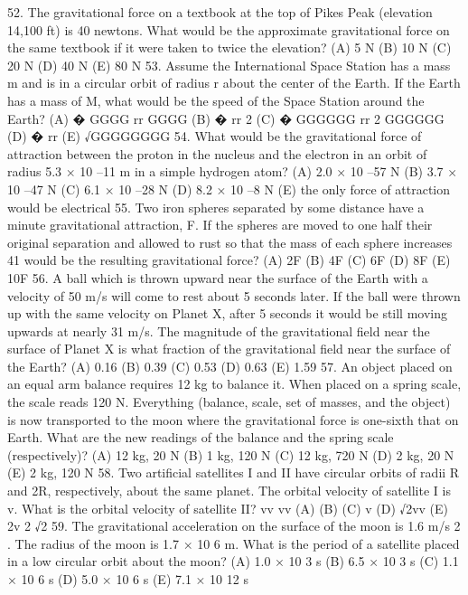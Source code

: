 52. The gravitational force on a textbook at the top of Pikes Peak (elevation 14,100 ft) is 40 newtons. What would
be the approximate gravitational force on the same textbook if it were taken to twice the elevation?
(A) 5 N (B) 10 N (C) 20 N (D) 40 N (E) 80 N
53. Assume the International Space Station has a mass m and is in a circular orbit of radius r about the center of the
Earth. If the Earth has a mass of M, what would be the speed of the Space Station around the Earth?
(A) �
GGGG
rr
GGGG
(B) �
rr 2
(C) �
GGGGGG
rr 2
GGGGGG
(D) �
rr
(E) √GGGGGGGG
54. What would be the gravitational force of attraction between the proton in the nucleus and the electron in an
orbit of radius 5.3 × 10 –11 m in a simple hydrogen atom?
(A) 2.0 × 10 –57 N (B) 3.7 × 10 –47 N (C) 6.1 × 10 –28 N (D) 8.2 × 10 –8 N
(E) the only force of attraction would be electrical
55. Two iron spheres separated by some distance have a minute gravitational attraction, F. If the spheres are moved
to one half their original separation and allowed to rust so that the mass of each sphere increases 41%
would be the resulting gravitational force?
(A) 2F (B) 4F (C) 6F (D) 8F (E) 10F
56. A ball which is thrown upward near the surface of the Earth with a velocity of 50 m/s will come to rest about 5
seconds later. If the ball were thrown up with the same velocity on Planet X, after 5 seconds it would be still
moving upwards at nearly 31 m/s. The magnitude of the gravitational field near the surface of Planet X is what
fraction of the gravitational field near the surface of the Earth?
(A) 0.16 (B) 0.39 (C) 0.53 (D) 0.63 (E) 1.59
57. An object placed on an equal arm balance requires 12 kg to balance it. When placed on a spring scale, the scale
reads 120 N. Everything (balance, scale, set of masses, and the object) is now transported to the moon where the
gravitational force is one-sixth that on Earth. What are the new readings of the balance and the spring scale
(respectively)?
(A) 12 kg, 20 N (B) 1 kg, 120 N (C) 12 kg, 720 N (D) 2 kg, 20 N (E) 2 kg, 120 N
58. Two artificial satellites I and II have circular orbits of radii R and 2R, respectively, about the same planet. The
orbital velocity of satellite I is v. What is the orbital velocity of satellite II?
vv
vv
(A)
(B)
(C) v (D) √2vv (E) 2v
2
√2
59. The gravitational acceleration on the surface of the moon is 1.6 m/s 2 . The radius of the moon is 1.7 × 10 6 m.
What is the period of a satellite placed in a low circular orbit about the moon?
(A) 1.0 × 10 3 s (B) 6.5 × 10 3 s (C) 1.1 × 10 6 s (D) 5.0 × 10 6 s (E) 7.1 × 10 12 s



\endinput


